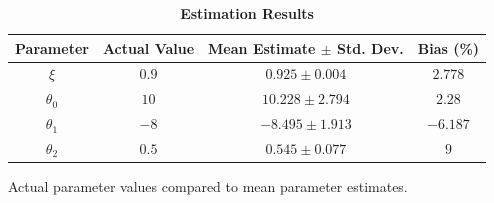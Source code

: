 \documentclass[10pt]{article}
\begin{document}
\begin{table}[!ht]
\caption{
\bf{Estimation Results}}
\begin{tabular}{|c|ccc|}	
\hline\hline 
Parameter & Actual Value & Mean Estimate $\pm$ Std. Dev. & Bias (\%) \\
\hline\hline
$\xi$ & $0.9$ & $0.925\pm 0.004$ & $2.778$ \\
$\theta_0$ & $10$ & $10.228\pm2.794$ & $2.28$\\
$\theta_1$ & $-8$ & $-8.495\pm1.913$ & $-6.187$\\
$\theta_2$ & $0.5$ & $0.545\pm0.077$ & $9$\\
\hline
\end{tabular}
\begin{flushleft}Actual parameter values compared to mean parameter estimates.
\end{flushleft}
\label{tab:Parameters estimates}
\end{table}
\end{document}
